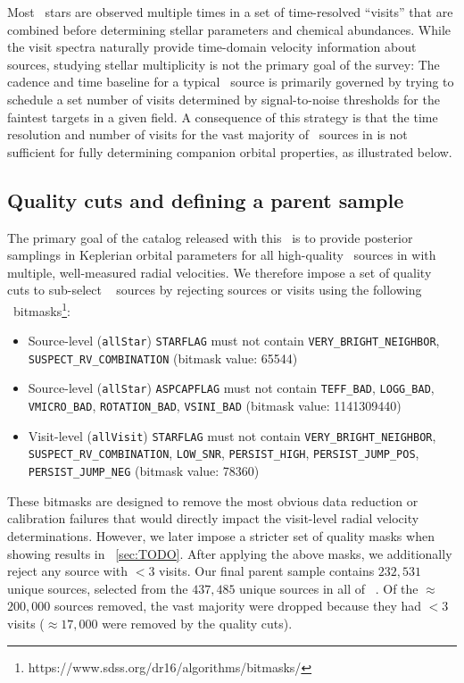 \documentclass[modern]{aastex62}
\begin{document}
Most \apogee\ stars are observed multiple times in a set of time-resolved
``visits'' that are combined before determining stellar parameters and chemical
abundances.
While the visit spectra naturally provide time-domain velocity information about
sources, studying stellar multiplicity is not the primary goal of the survey:
The cadence and time baseline for a typical \apogee\ source is primarily
governed by trying to schedule a set number of visits determined by
signal-to-noise thresholds for the faintest targets in a given field.
A consequence of this strategy is that the time resolution and number of visits
for the vast majority of \apogee\ sources in  is not sufficient for fully
determining companion orbital properties, as illustrated below.

\subsection{Quality cuts and defining a parent sample}

The primary goal of the catalog released with this \documentname\ is to provide
posterior samplings in Keplerian orbital parameters for all high-quality
\apogee\ sources in  with multiple, well-measured radial velocities.
We therefore impose a set of quality cuts to sub-select \apogee\  sources
by rejecting sources or visits using the following \apogee\
bitmasks\footnote{https://www.sdss.org/dr16/algorithms/bitmasks/}:
\begin{itemize}
    \item Source-level (\texttt{allStar}) \texttt{STARFLAG} must not contain \texttt{VERY\_BRIGHT\_NEIGHBOR}, \texttt{SUSPECT\_RV\_COMBINATION} (bitmask value: 65544)
    \item Source-level (\texttt{allStar}) \texttt{ASPCAPFLAG} must not contain \texttt{TEFF\_BAD}, \texttt{LOGG\_BAD}, \texttt{VMICRO\_BAD}, \texttt{ROTATION\_BAD}, \texttt{VSINI\_BAD} (bitmask value: 1141309440)
    \item Visit-level (\texttt{allVisit}) \texttt{STARFLAG} must not contain \texttt{VERY\_BRIGHT\_NEIGHBOR}, \texttt{SUSPECT\_RV\_COMBINATION}, \texttt{LOW\_SNR}, \texttt{PERSIST\_HIGH}, \texttt{PERSIST\_JUMP\_POS}, \texttt{PERSIST\_JUMP\_NEG} (bitmask value: 78360)
\end{itemize}
These bitmasks are designed to remove the most obvious data reduction or
calibration failures that would directly impact the visit-level radial velocity
determinations.
However, we later impose a stricter set of quality masks when showing results in
\sectionname~\ref{sec:TODO}.
After applying the above masks, we additionally reject any source with $<3$
visits.
Our final parent sample contains $232,531$ unique sources, selected from the
$437,485$ unique sources in all of \apogee\ \dr{16}.
Of the $\approx$$200,000$ sources removed, the vast majority were dropped
because they had $<3$ visits ($\approx$$17,000$ were removed by the quality
cuts).
\end{document}
